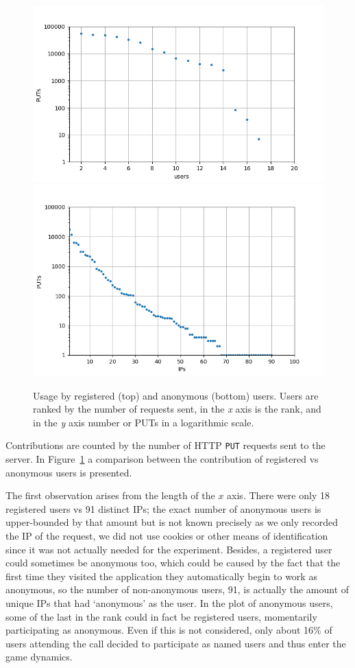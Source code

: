 \documentclass{llncs}
\begin{document}
\begin{figure}[h!tb]
    \centering
        \includegraphics[width=0.9\linewidth]{img/puts_user.png}
        \includegraphics[width=0.9\linewidth]{img/puts_ip.png}
    \caption{Usage by registered (top) and anonymous (bottom) users.  Users are ranked by
        the number of requests sent, in the \emph{x} axis is the rank, and in the \emph{y} axis
        number or PUTs in a logarithmic scale.}
      \label{fig:puts}
\end{figure}
%
Contributions are counted by the number of HTTP {\tt PUT} requests
sent to the server. In Figure~\ref{fig:puts} a comparison between the 
contribution of registered vs anonymous users is presented.

The first observation arises from the length of the $x$ axis. There
were only 18 registered users vs 91 distinct IPs; the 
exact number of anonymous users is upper-bounded by that amount but is
not known precisely as we only recorded the IP of the request, we did
not use cookies or other means of identification since it was not
actually needed for the experiment. Besides, a registered user
could sometimes be anonymous too, which could be caused by the fact that the first time they visited
the application they automatically begin to work as anonymous, so the
number of non-anonymous users, 91, is actually the amount of unique
IPs that had `anonymous' as the user. In the plot of 
anonymous users, some of the last in the rank could in fact be registered users,
momentarily participating as anonymous. Even if this is not considered, only
about 16\% of users attending the call decided to participate as named
users and thus enter the game dynamics. 
\end{document}
